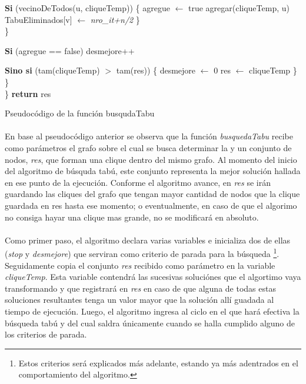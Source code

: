 \begin{algorithm}[H]
	\BlankLine		
	\tab \tab \tab \textbf{Si} (vecinoDeTodos(u, cliqueTemp)) \{ 								
	\tab \tab \tab \tab agregue $\leftarrow$ true												
	\tab \tab \tab \tab agregar(cliqueTemp, u) 													
	\tab \tab \tab \tab TabuEliminados[v] $\leftarrow$ \textit{nro\_it+n/2}					
	\tab \tab \tab \} \\
	\tab \tab \}

	\BlankLine \BlankLine		
	\tab \tab \textbf{Si} (agregue == false) 													
	\tab \tab \tab desmejore++																	
	
	\BlankLine \BlankLine
	\tab \tab \textbf{Sino si} (tam(cliqueTemp) $>$ tam(res)) \{								
	\tab \tab \tab desmejore $\leftarrow$ 0													
	\tab \tab \tab res $\leftarrow$ cliqueTemp													
	\tab \tab \} \\
	\tab \} \\
	\}
	\BlankLine \BlankLine		
	\textbf{return} res																			
\caption{Pseudocódigo de la función busqudaTabu} 
\normalsize
\end{algorithm}

\paragraph{}
En base al pseudocódigo anterior se observa que la función \textit{busquedaTabu} recibe como parámetros el grafo sobre el cual se busca determinar la \mc y un conjunto de nodos, \textit{res}, que forman una clique dentro del mismo grafo. Al momento del inicio del algoritmo de búsquda tabú, este conjunto representa la mejor solución hallada en ese punto de la ejecución. Conforme el algoritmo avance, en \textit{res} se irán guardando las cliques del grafo que tengan mayor cantidad de nodos que la clique guardada en res hasta ese momento; o eventualmente, en caso de que el algorimo no consiga hayar una clique mas grande, no se modificará en absoluto.

\paragraph{}
Como primer paso, el algoritmo declara varias variables e inicializa dos de ellas (\textit{stop} y \textit{desmejore}) que serviran como criterio de parada para la búsqueda \footnote{Estos criterios será explicados más adelante, estando ya más adentrados en el comportamiento del algoritmo.}. Seguidamente copia el conjunto \textit{res} recibido como parámetro en la variable \textit{cliqueTemp}. Esta variable contendrá las sucesivas soluciónes que el algortimo vaya transformando y que registrará en \textit{res} en caso de que alguna de todas estas soluciones resultantes tenga un valor mayor que la solución allí guadada al tiempo de ejecución. Luego, el algoritmo ingresa al ciclo en el que hará efectiva la búsqueda tabú y del cual saldra únicamente cuando se halla cumplido alguno de los criterios de parada.  

